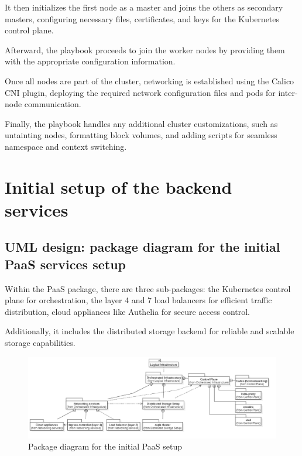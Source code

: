 \hspace{7mm}It then initializes the first node as a master and joins the others as secondary masters, configuring necessary files, certificates, and keys for the Kubernetes control plane.

\hspace{7mm}Afterward, the playbook proceeds to join the worker nodes by providing them with the appropriate configuration information. 

\hspace{7mm}Once all nodes are part of the cluster, networking is established using the Calico CNI plugin, deploying the required network configuration files and pods for inter-node communication. 

\hspace{7mm}Finally, the playbook handles any additional cluster customizations, such as untainting nodes, formatting block volumes, and adding scripts for seamless namespace and context switching.
\newpage
\section{Initial setup of the backend services }
\subsection{UML design: package diagram for the initial PaaS services setup}

\hspace{7mm}Within the PaaS package, there are three sub-packages: the Kubernetes control plane for orchestration, the layer 4 and 7 load balancers for efficient traffic distribution, cloud appliances like Authelia for secure access control.

Additionally, it includes the distributed storage backend for reliable and scalable storage capabilities.

\begin{figure}[H]\centering
\includegraphics[width=1.0\textwidth,angle=00]{assets/f21.png}
\caption{ Package diagram for the initial PaaS setup }
\label{fig:package diagram for the initial PaaS setup}
\end{figure}

